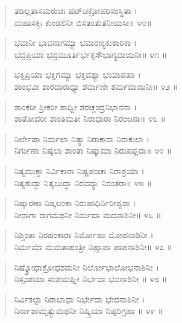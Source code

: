 \begin{verse}
ತಡಿಲ್ಲತಾಸಮರುಚಿಃ ಷಟ್​ಚಕ್ರೋಪರಿಸಂಸ್ಥಿತಾ ।\\ಮಹಾಸಕ್ತಿಃ ಕುಂಡಲಿನೀ  ಬಿಸತಂತುತನೀಯಸೀ\num{॥ ೪೦॥}
\end{verse}

\begin{verse}
ಭವಾನೀ ಭಾವನಾಗಮ್ಯಾ ಭವಾರಣ್ಯಕುಠಾರಿಕಾ ।\\ಭದ್ರಪ್ರಿಯಾ ಭದ್ರಮೂರ್ತಿರ್ಭಕ್ತಸೌಭಾಗ್ಯದಾಯಿನೀ\num{॥ ೪೧ ॥}
\end{verse}

\begin{verse}
ಭಕ್ತಿಪ್ರಿಯಾ ಭಕ್ತಿಗಮ್ಯಾ ಭಕ್ತಿವಶ್ಯಾ  ಭಯಾಪಹಾ ।\\ಶಾಂಭವೀ ಶಾರದಾರಾಧ್ಯಾ ಶರ್ವಾಣೀ ಶರ್ಮದಾಯಿನೀ\num{॥ ೪೨ ॥}
\end{verse}

\begin{verse}
ಶಾಂಕರೀ ಶ್ರೀಕರೀ ಸಾಧ್ವೀ ಶರಚ್ಚಂದ್ರನಿಭಾನನಾ ।\\ಶಾತೋದರೀ  ಶಾಂತಿಮತೀ ನಿರಾಧಾರಾ ನಿರಂಜನಾ\num{॥ ೪೩ ॥}
\end{verse}

\begin{verse}
ನಿರ್ಲೇಪಾ ನಿರ್ಮಲಾ ನಿತ್ಯಾ ನಿರಾಕಾರಾ ನಿರಾಕುಲಾ ।\\ನಿರ್ಗುಣಾ ನಿಷ್ಕಲಾ  ಶಾಂತಾ ನಿಷ್ಕಾಮಾ ನಿರುಪಪ್ಲವಾ\num{॥ ೪೪ ॥}
\end{verse}

\begin{verse}
ನಿತ್ಯಮುಕ್ತಾ ನಿರ್ವಿಕಾರಾ ನಿಷ್ಪ್ರಪಂಚಾ ನಿರಾಶ್ರಯಾ ।\\ನಿತ್ಯಶುದ್ಧಾ ನಿತ್ಯಬುದ್ಧಾ ನಿರವದ್ಯಾ  ನಿರಂತರಾ\num{॥ ೪೫ ॥}
\end{verse}

\begin{verse}
ನಿಷ್ಕಾರಣಾ ನಿಷ್ಕಲಂಕಾ ನಿರುಪಾಧಿರ್ನಿರೀಶ್ವರಾ ।\\ನೀರಾಗಾ ರಾಗಮಥನೀ ನಿರ್ಮದಾ ಮದನಾಶಿನೀ\num{॥ ೪೬ ॥}
\end{verse}

\begin{verse}
ನಿಶ್ಚಿಂತಾ  ನಿರಹಂಕಾರಾ ನಿರ್ಮೋಹಾ ಮೋಹನಾಶಿನೀ ।\\ನಿರ್ಮಮಾ ಮಮತಾಹಂತ್ರೀ ನಿಷ್ಪಾಪಾ ಪಾಪನಾಶಿನೀ\num{॥ ೪೭ ॥}
\end{verse}

\begin{verse}
ನಿಷ್ಕ್ರೋಧಾಕ್ರೋಧಶಮನೀ ನಿರ್ಲೋಭಾಲೋಭನಾಶಿನೀ ।\\ನಿಸ್ಸಂಶಯಾ ಸಂಶಯಘ್ನೀ ನಿರ್ಭವಾ ಭವನಾಶಿನೀ \num{॥ ೪೮ ॥}
\end{verse}

\begin{verse}
ನಿರ್ವಿಕಲ್ಪಾ ನಿರಾಬಾಧಾ ನಿರ್ಭೇದಾ ಭೇದನಾಶಿನೀ ।\\ನಿರ್ನಾಶಾಮೃತ್ಯುಮಥನೀ ನಿಷ್ಕ್ರಿಯಾ ನಿಷ್ಪರಿಗ್ರಹಾ \num{॥ ೪೯ ॥}
\end{verse}

